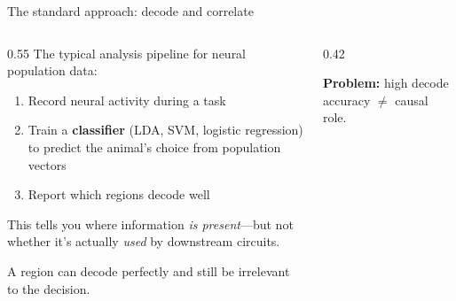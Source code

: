 \documentclass[aspectratio=169,11pt]{beamer}
\begin{document}
\begin{frame}{The standard approach: decode and correlate}
\begin{columns}[T]
\begin{column}{0.55\textwidth}
{\small The typical analysis pipeline for neural population data:}

\vspace{0.3em}
\begin{enumerate}\setlength\itemsep{0.3em}
  \item {\small Record neural activity during a task}
  \item {\small Train a \textbf{classifier} (LDA, SVM, logistic regression) to predict the animal's choice from population vectors}
  \item {\small Report which regions decode well}
\end{enumerate}

\vspace{0.5em}
{\small This tells you where information \emph{is present}---but not whether it's actually \emph{used} by downstream circuits.}

\vspace{0.3em}
{\small A region can decode perfectly and still be irrelevant to the decision.}
\end{column}
\begin{column}{0.42\textwidth}
\centering
\vspace{0.5em}

\vspace{0.5em}
{\small \textbf{Problem:} high decode accuracy $\neq$ causal role.}
\end{column}
\end{columns}
\end{frame}
\end{document}
